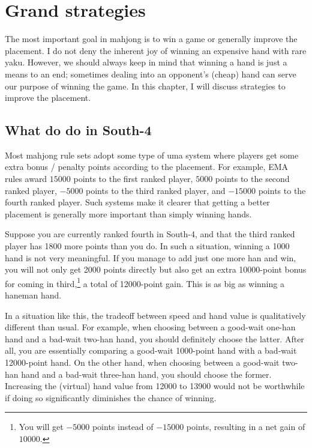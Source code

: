 
\chapter{Grand strategies} \label{ch:grand}
\thispagestyle{empty}
The most important goal in mahjong is to win a game or generally improve the placement. I do not deny the inherent joy of winning an expensive hand with rare {\jap yaku}. However, we should always keep in mind that winning a hand is just a means to an end; sometimes dealing into an opponent's (cheap) hand can serve our purpose of winning the game.
In this chapter, I will discuss strategies to improve the placement.

\section{What do do in South-4}
Most mahjong rule sets adopt some type of {\jap uma} system where players get some extra bonus / penalty points according to the placement. For example, EMA rules award $15000$ points to the first ranked player, $5000$ points to the second ranked player, $-5000$ points to the third ranked player, and $-15000$ points to the fourth ranked player. 
Such systems make it clearer that getting a better placement is generally more important than simply winning hands.

\bigskip
Suppose you are currently ranked fourth in South-4, and that the third ranked player has 1800 more points than you do. In such a situation, winning a 1000 hand is not very meaningful. If you manage to add just one more {\jap han} and win, you will not only get 2000 points directly but also get an extra 10000-point bonus for coming in third,\footnote{You will get $-5000$ points instead of $-15000$ points, resulting in a net gain of $10000$.} a total of 12000-point gain. This is as big as winning a {\jap haneman} hand.

\bigskip
In a situation like this, the tradeoff between speed and hand value is qualitatively different than usual. For example, when choosing between a good-wait one-{\jap han} hand and a bad-wait two-{\jap han} hand, you should definitely choose the latter. After all, you are essentially comparing a good-wait 1000-point hand with a bad-wait 12000-point hand. On the other hand, when choosing between a good-wait two-{\jap han} hand and a bad-wait three-{\jap han} hand, you should choose the former. Increasing the (virtual) hand value from 12000 to 13900 would not be worthwhile if doing so significantly diminishes the chance of winning.

